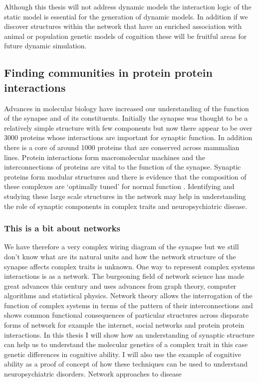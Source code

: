 Although this thesis will not address dynamic models the interaction logic of the static model is essential for the generation of dynamic models. In addition if we discover structures within the network that have an enriched association with animal or population genetic models of cognition these will be fruitful areas for future dynamic simulation. 

\subsection{Finding communities in protein protein interactions}
Advances in molecular biology have increased our understanding of the function of the synapse and of its constituents. Initially the synapse was thought to be a relatively simple structure with few components but now there appear to be over 3000 proteins whose interactions are important for synaptic function. In addition there is a core of around 1000 proteins that are conserved across mammalian lines.  Protein interactions form macromolecular machines and the interconnections of proteins are vital to the function of the synapse. 
Synaptic proteins form modular structures \cite{pocklington2006proteomes} and there is evidence that the composition of these complexes are ‘optimally tuned’ for normal function \cite{grant2012synaptopathies}. Identifying and studying these large scale structures in the network may help in understanding the role of synaptic components in complex traits and neuropsychiatric disease.




\subsubsection{This is a bit about networks}
We have therefore a very complex wiring diagram of the synapse but we still don’t know what are its natural units and how the network structure of the synapse affects complex traits is unknown. One way to represent complex systems interactions is as a network. The burgeoning field of network science has made great advances this century and uses advances from graph theory, computer algorithms and statistical physics. Network theory allows the interrogation of the function of complex systems in terms of the pattern of their interconnections and shows common functional consequences of particular structures across disparate forms of network for example the internet, social networks and protein protein interactions. In this thesis I will show how an understanding of synaptic structure can help us to understand the molecular genetics of a complex trait in this case genetic differences in cognitive ability. I will also use the example of cognitive ability as a proof of concept of how these techniques can be used to understand neuropsychiatric disorders. Network approaches to disease

